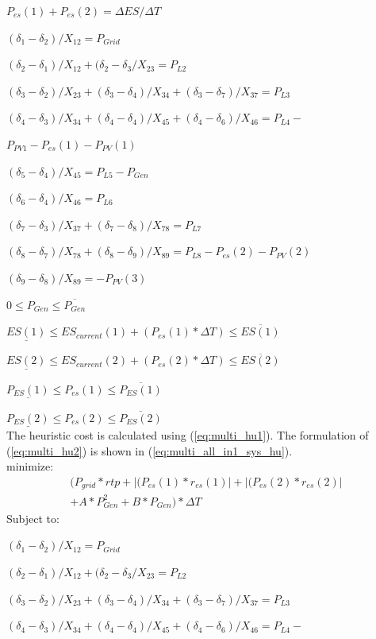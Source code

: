 $P_{es}(1)+P_{es}(2) = \Delta ES / \Delta T$

$(\delta_1 - \delta_2)/X_{12} = P_{Grid}$

$(\delta_2 - \delta_1)/X_{12}+ (\delta_2 - \delta_3/X_{23} = P_{L2}$

$(\delta_3 - \delta_2)/X_{23}+(\delta_3 - \delta_4)/X_{34}+(\delta_3 - \delta_7)/X_{37} = P_{L3}$

$(\delta_4 - \delta_3)/X_{34}+(\delta_4 - \delta_4)/X_{45}+(\delta_4 - \delta_6)/X_{46}=P_{L4} -$

$P_{PV1} - P_{es}(1) - P_{PV}(1)$

$(\delta_5 - \delta_4)/X_{45} = P_{L5}-P_{Gen}$

$(\delta_6 - \delta_4)/X_{46} = P_{L6}$

$(\delta_7 - \delta_3)/X_{37} + (\delta_7 - \delta_8)/X_{78}  = P_{L7}$

$(\delta_8 - \delta_7)/X_{78} + (\delta_8 - \delta_9)/X_{89}  = P_{L8} - P_{es}(2) - P_{PV}(2)$

$(\delta_9 - \delta_8)/X_{89} = -P_{PV}(3)$

$0 \leq P_{Gen} \leq \overline{P_{Gen}}$

$\underline{ES(1)} \leq ES_{current}(1)+(P_{es}(1)*\Delta T) \leq \overline{ES(1)}$

$\underline{ES(2)} \leq ES_{current}(2)+(P_{es}(2)*\Delta T) \leq \overline{ES(2)}$

$\underline{P_{ES}(1)} \leq P_{es}(1) \leq \overline{P_{ES}(1)}$

$\underline{P_{ES}(2)} \leq P_{es}(2) \leq \overline{P_{ES}(2)}$\\

The heuristic cost is calculated using (\ref{eq:multi_hu1}). The formulation of (\ref{eq:multi_hu2}) is shown in (\ref{eq:multi_all_in1_sys_hu}).\\
minimize:
\begin{multline}
\label{eq:multi_all_in1_sys_hu}
    ( P_{grid}*rtp + |(P_{es}(1)*r_{es}(1)| + |(P_{es}(2)*r_{es}(2)| \\ + A*P_{Gen}^2 + B*P_{Gen} )*\Delta T
\end{multline}
Subject to:

$(\delta_1 - \delta_2)/X_{12} = P_{Grid}$

$(\delta_2 - \delta_1)/X_{12}+ (\delta_2 - \delta_3/X_{23} = P_{L2}$

$(\delta_3 - \delta_2)/X_{23}+(\delta_3 - \delta_4)/X_{34}+(\delta_3 - \delta_7)/X_{37} = P_{L3}$

$(\delta_4 - \delta_3)/X_{34}+(\delta_4 - \delta_4)/X_{45}+(\delta_4 - \delta_6)/X_{46}=P_{L4} -$

